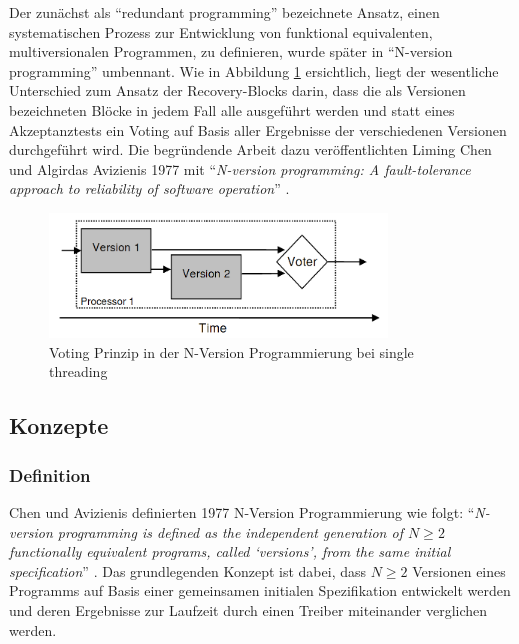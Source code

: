 %
Der zunächst als \enquote{redundant programming} bezeichnete Ansatz, einen systematischen Prozess zur Entwicklung von funktional equivalenten, multiversionalen Programmen, zu definieren, wurde später in \enquote{N-version programming} umbennant.
Wie in Abbildung \ref{graph-n-version-single} ersichtlich, liegt der wesentliche Unterschied zum Ansatz der Recovery-Blocks darin, dass die als Versionen bezeichneten Blöcke in jedem Fall alle ausgeführt werden und statt eines Akzeptanztests ein Voting auf Basis aller Ergebnisse der verschiedenen Versionen durchgeführt wird.
Die begründende Arbeit dazu veröffentlichten Liming Chen und Algirdas Avizienis 1977 mit \enquote{\emph{N-version programming: A fault-tolerance approach to reliability of software operation}} \cite{Chen1978}.
%
%
\begin{figure}[ht]
	\centering
	\includegraphics[width=0.8\textwidth,natwidth=901,natheight=333]{grafiken/single-thread-n-version.png}
	\caption{Voting Prinzip in der N-Version Programmierung bei single threading \cite{lucent}}
	\label{graph-n-version-single}
\end{figure}
%
%

\subsection{Konzepte} \label{konzepte}

\subsubsection{Definition}
Chen und Avizienis definierten 1977 N-Version Programmierung wie folgt: \enquote{\emph{N-version programming is defined as the independent generation of $ N \geq 2 $ functionally equivalent programs, called \enquote{versions}, from the same initial specification}} \cite{Chen1978}.
Das grundlegenden Konzept ist dabei, dass $ N \geq 2 $ Versionen eines Programms auf Basis einer gemeinsamen initialen Spezifikation entwickelt werden und deren Ergebnisse zur Laufzeit durch einen Treiber miteinander verglichen werden.
%

%
